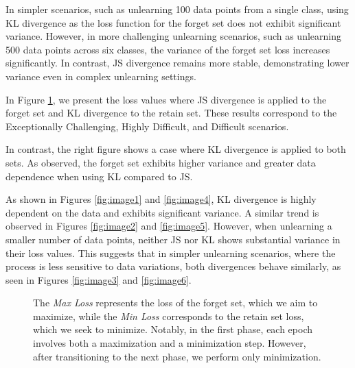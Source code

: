 \documentclass{article} %
\begin{document}
In simpler scenarios, such as unlearning 100 data points from a single class, using KL divergence as the loss function for the forget set does not exhibit significant variance. However, in more challenging unlearning scenarios, such as unlearning 500 data points across six classes, the variance of the forget set loss increases significantly. In contrast, JS divergence remains more stable, demonstrating lower variance even in complex unlearning settings.

In Figure \ref{fig:combined_all}, we present the loss values where JS divergence is applied to the forget set and KL divergence to the retain set. These results correspond to the Exceptionally Challenging, Highly Difficult, and Difficult scenarios.

In contrast, the right figure shows a case where KL divergence is applied to both sets. As observed, the forget set exhibits higher variance and greater data dependence when using KL compared to JS.

As shown in Figures \ref{fig:image1} and \ref{fig:image4}, KL divergence is highly dependent on the data and exhibits significant variance. A similar trend is observed in Figures \ref{fig:image2} and \ref{fig:image5}. However, when unlearning a smaller number of data points, neither JS nor KL shows substantial variance in their loss values. This suggests that in simpler unlearning scenarios, where the process is less sensitive to data variations, both divergences behave similarly, as seen in Figures \ref{fig:image3} and \ref{fig:image6}.

\begin{figure}[H]
    \centering
    \vspace{-10pt}
    \hfill
    \hfill
    \hfill
    \hfill
    \hfill
    \caption{The \textit{Max Loss} represents the loss of the forget set, which we aim to maximize, while the \textit{Min Loss} corresponds to the retain set loss, which we seek to minimize. Notably, in the first phase, each epoch involves both a maximization and a minimization step. However, after transitioning to the next phase, we perform only minimization.}
    \vspace{-10pt}
    \label{fig:combined_all}
\end{figure}
\vspace{-0.1in}
\end{document}
